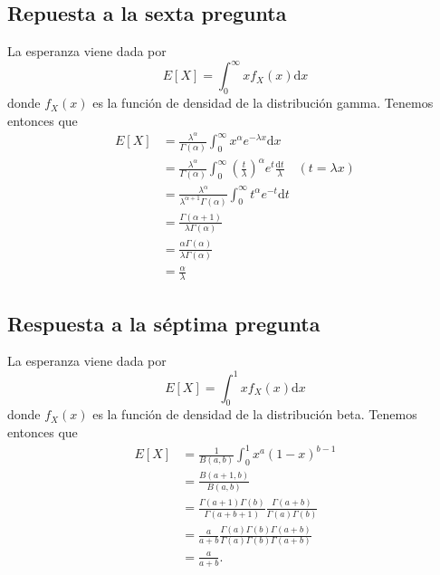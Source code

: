 \subsection{Repuesta a la sexta pregunta}
La esperanza viene dada por
\[ E[X] = \int_0^\infty xf_X(x) \mathrm{d}x \]
donde $f_X(x)$ es la función de densidad de la distribución gamma. Tenemos entonces que
\begin{align*}
	E[X] &= \frac{\lambda^\alpha}{\Gamma(\alpha)} \int_0^\infty	x^\alpha e^{-\lambda x} \mathrm{d}x \\
		 &= \frac{\lambda^\alpha}{\Gamma(\alpha)} \int_0^\infty \left( \frac{t}{\lambda} \right)^\alpha e^t \frac{\mathrm{d}t}{\lambda} \quad (t=\lambda x)\\
		 &= \frac{\lambda^\alpha}{\lambda^{\alpha+1}\Gamma(\alpha)} \int_0^\infty t^\alpha e^{-t} \mathrm{d}t \\
		 &= \frac{\Gamma(\alpha+1)}{\lambda\Gamma(\alpha)} \\
		 &= \frac{\alpha\Gamma(\alpha)}{\lambda\Gamma(\alpha)} \\
		 &= \frac{\alpha}{\lambda}
\end{align*}
\subsection{Respuesta a la séptima pregunta}
La esperanza viene dada por
\[ E[X] = \int_0^1 xf_X(x) \mathrm{d}x \]
donde $f_X(x)$ es la función de densidad de la distribución beta. Tenemos entonces que
\begin{align*}
	E[X] &= \frac{1}{B(a,b)} \int_0^1 x^a (1-x)^{b-1} \\
		 &= \frac{B(a+1,b)}{B(a,b)} \\
		 &= \frac{\Gamma(a+1)\Gamma(b)}{\Gamma(a+b+1)} \frac{\Gamma(a+b)}{\Gamma(a)\Gamma(b)} \\
		 &= \frac{a}{a+b} \frac{\Gamma(a)\Gamma(b)\Gamma(a+b)}{\Gamma(a)\Gamma(b)\Gamma(a+b)} \\
		 &= \frac{a}{a+b}.
\end{align*}
